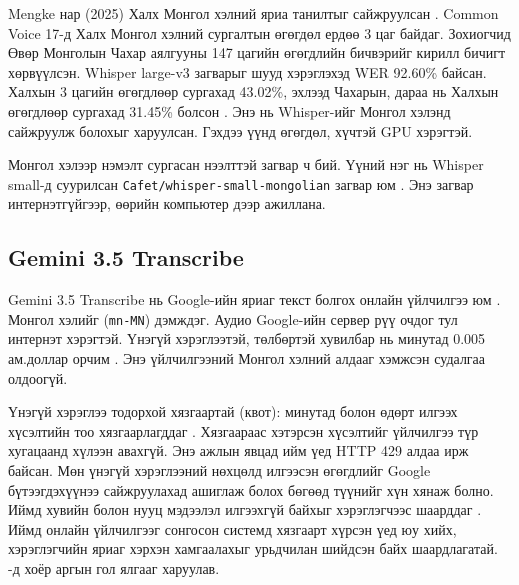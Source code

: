 Mengke нар (2025) Халх Монгол хэлний яриа танилтыг сайжруулсан \cite{mengke2025khalkha}. Common Voice 17-д Халх Монгол хэлний сургалтын өгөгдөл ердөө 3 цаг байдаг. Зохиогчид Өвөр Монголын Чахар аялгууны 147 цагийн өгөгдлийн бичвэрийг кирилл бичигт хөрвүүлсэн. Whisper large-v3 загварыг шууд хэрэглэхэд WER 92.60\% байсан. Халхын 3 цагийн өгөгдлөөр сургахад 43.02\%, эхлээд Чахарын, дараа нь Халхын өгөгдлөөр сургахад 31.45\% болсон \cite{mengke2025khalkha}. Энэ нь Whisper-ийг Монгол хэлэнд сайжруулж болохыг харуулсан. Гэхдээ үүнд өгөгдөл, хүчтэй \ac{GPU} хэрэгтэй.

Монгол хэлээр нэмэлт сургасан нээлттэй загвар ч бий. Үүний нэг нь Whisper small-д суурилсан \texttt{Cafet/\allowbreak whisper-small-\allowbreak mongolian} загвар юм \cite{cafet_whisper_small_mn}. Энэ загвар интернэтгүйгээр, өөрийн компьютер дээр ажиллана.

\subsection{Gemini 3.5 Transcribe}

Gemini 3.5 Transcribe нь Google-ийн яриаг текст болгох онлайн үйлчилгээ юм \cite{google_transcribe_model}. Монгол хэлийг (\texttt{mn-MN}) дэмждэг. Аудио Google-ийн сервер рүү очдог тул интернэт хэрэгтэй. Үнэгүй хэрэглээтэй, төлбөртэй хувилбар нь минутад 0.005 ам.доллар орчим \cite{google_pricing}. Энэ үйлчилгээний Монгол хэлний алдааг хэмжсэн судалгаа олдоогүй.

Үнэгүй хэрэглээ тодорхой хязгаартай (квот): минутад болон өдөрт илгээх хүсэлтийн тоо хязгаарлагддаг \cite{google_rate_limits}. Хязгаараас хэтэрсэн хүсэлтийг үйлчилгээ түр хугацаанд хүлээн авахгүй. Энэ ажлын явцад ийм үед HTTP 429 алдаа ирж байсан. Мөн үнэгүй хэрэглээний нөхцөлд илгээсэн өгөгдлийг Google бүтээгдэхүүнээ сайжруулахад ашиглаж болох бөгөөд түүнийг хүн хянаж болно. Иймд хувийн болон нууц мэдээлэл илгээхгүй байхыг хэрэглэгчээс шаарддаг \cite{google_terms}. Иймд онлайн үйлчилгээг сонгосон системд хязгаарт хүрсэн үед юу хийх, хэрэглэгчийн яриаг хэрхэн хамгаалахыг урьдчилан шийдсэн байх шаардлагатай. -д хоёр аргын гол ялгааг харуулав.

